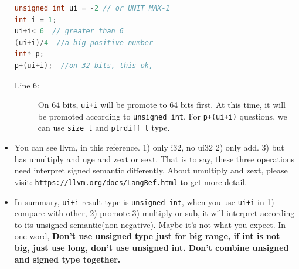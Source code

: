 \documentclass[a4paper,11pt,twoside]{book}
\begin{document}
\begin{itemize}
\begin{lstlisting}[frame=single, language=c++]
unsigned int ui = -2 // or UNIT_MAX-1
int i = 1;
ui+i< 6  // greater than 6
(ui+i)/4  //a big positive number
int* p;
p+(ui+i);  //on 32 bits, this ok, 
\end{lstlisting}

\begin{description}
	\item[Line 6:] On 64 bits, \texttt{ui+i} will be promote to 64 bits first. At this time, it will be promoted according to \texttt{unsigned int}. For \texttt{p+(ui+i)} questions, we can use \texttt{size\_t} and \texttt{ptrdiff\_t} type. 
\end{description}
	
	\item You can see llvm, in this reference. 1) only i32, no ui32 2) only add.  3) but has umultiply and uge and zext or sext. That is to say, these three operations need interpret signed semantic differently.  About umultiply and zext, please visit: \verb|https://llvm.org/docs/LangRef.html| to get more detail.

    \item In summary, \texttt{ui+i} result type is \texttt{unsigned int},  when you use \texttt{ui+i} in 1) compare with other, 2) promote 3) multiply or sub, it will interpret according to its unsigned semantic(non negative). Maybe it's not what you expect.  In one word, \textbf{Don't use unsigned type just for big range, if int is not big, just use long, don't use unsigned int. Don't combine unsigned and signed type together.}	
\end{itemize}
\end{document}
